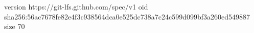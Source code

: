 version https://git-lfs.github.com/spec/v1
oid sha256:56ac7678fe82e4f3c938564dca0e525dc738a7c24c599d099bf3a260ed549887
size 70

